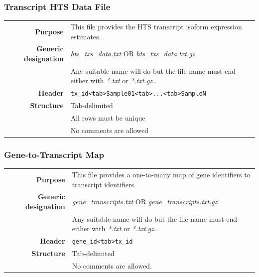 \documentclass[a4paper,12pt]{article}
\begin{document}
\subsubsection{Transcript HTS Data File}
\label{tiep:transcript}

\begin{tabular}{rp{12cm}}
\textbf{Purpose} & This file provides the HTS transcript isoform expression estimates. \\
\textbf{Generic designation} & \textit{hts\_txs\_data.txt} OR \textit{hts\_txs\_data.txt.gz} \\
  & Any suitable name will do but the file name must end either with \textit{*.txt} or \textit{*.txt.gz}.. \\
\textbf{Header} & \texttt{tx\_id\textless tab\textgreater Sample01\textless tab\textgreater...\textless tab\textgreater SampleN} \\
\textbf{Structure} & Tab-delimited \\
  & All rows must be unique \\
  & No comments are allowed \\
\end{tabular}

\subsubsection{Gene-to-Transcript Map}
\label{tiep:gene}

\begin{tabular}{rp{12cm}}
\textbf{Purpose} & This file provides a one-to-many map of gene identifiers to transcript  identifiers. \\
\textbf{Generic designation} & \textit{gene\_transcripts.txt} OR \textit{gene\_transcripts.txt.gz} \\
  & Any suitable name will do but the file name must end either with \textit{*.txt} or \textit{*.txt.gz}.. \\
\textbf{Header} & \texttt{gene\_id\textless tab\textgreater tx\_id} \\
\textbf{Structure} & Tab-delimited \\
  & No comments are allowed. \\
\end{tabular}
\end{document}
